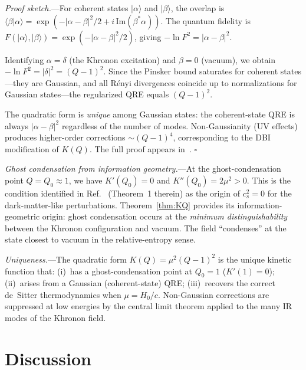 \documentclass[prl,twocolumn,superscriptaddress,longbibliography,floatfix]{revtex4-2}
\newcommand{\ket}[1]{|#1\rangle}
\newcommand{\braket}[2]{\langle#1|#2\rangle}
\begin{document}
\emph{Proof sketch.}---For coherent states
$\ket{\alpha}$ and $\ket{\beta}$, the overlap is
$\braket{\beta}{\alpha} = \exp(-|\alpha-\beta|^2/2
+ i\,\mathrm{Im}(\beta^*\alpha))$.  The quantum fidelity is
$F(\ket{\alpha},\ket{\beta}) = \exp(-|\alpha-\beta|^2/2)$, giving
$-\ln F^2 = |\alpha - \beta|^2$.

Identifying $\alpha = \delta$ (the Khronon excitation) and
$\beta = 0$ (vacuum), we obtain
$-\ln F^2 = |\delta|^2 = (Q-1)^2$.  Since the Pinsker bound
saturates for coherent states---they are Gaussian, and all
R\'{e}nyi divergences coincide up to normalizations for Gaussian
states---the regularized QRE equals $(Q-1)^2$.

The quadratic form is \emph{unique} among Gaussian states: the
coherent-state QRE is always $|\alpha - \beta|^2$ regardless of
the number of modes.  Non-Gaussianity (UV effects) produces
higher-order corrections $\sim (Q-1)^4$, corresponding to the
DBI modification of $K(Q)$.  The full proof appears
in~\cite{SM}.
\hfill$\square$

\emph{Ghost condensation from information geometry.}---At the
ghost-condensation point $Q = Q_0 \approx 1$, we have
$K'(Q_0) = 0$ and $K''(Q_0) = 2\mu^2 > 0$.  This is the
condition identified in Ref.~\cite{Paper3} (Theorem~1 therein)
as the origin of $c_s^2 = 0$ for the dark-matter-like
perturbations.  Theorem~\ref{thm:KQ} provides its
information-geometric origin: ghost condensation occurs at the
\emph{minimum distinguishability} between the Khronon configuration
and vacuum.  The field ``condenses'' at the state closest to
vacuum in the relative-entropy sense.

\emph{Uniqueness.}---The quadratic form
$K(Q) = \mu^2(Q-1)^2$ is the unique kinetic function that:
(i)~has a ghost-condensation point at $Q_0 = 1$
($K'(1) = 0$);
(ii)~arises from a Gaussian (coherent-state) QRE;
(iii)~recovers the correct de~Sitter thermodynamics when
$\mu = H_0/c$.  Non-Gaussian corrections are suppressed at
low energies by the central limit theorem applied to the many
IR modes of the Khronon field.

\section{Discussion}
\label{sec:discussion}
\end{document}
